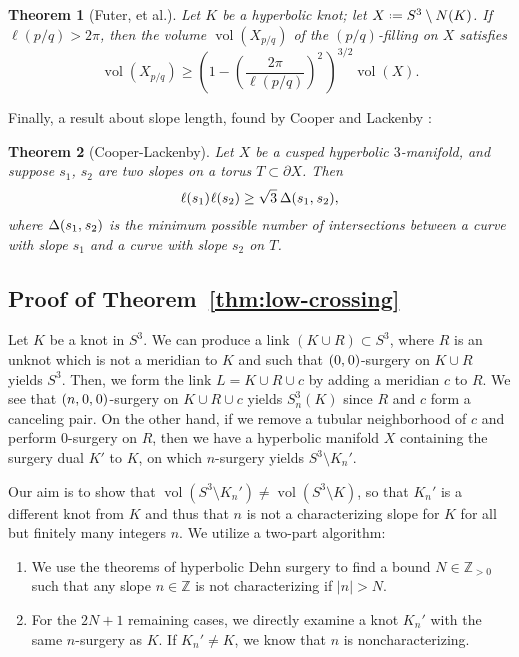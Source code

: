 \documentclass[11pt,usenames,dvipsnames,reqno]{amsart}
\newcommand{\zz}{\mathbb{Z}}
\newcommand{\vol}{\operatorname{vol}}
\newcommand{\defeq}{\mathrel{\vcenter{\baselineskip0.5ex\lineskiplimit0pt\hbox{\scriptsize.}\hbox{\scriptsize.}}}=}
\newcommand{\hs}{\hspace{0.05em}} %
\newtheorem{theorem}{Theorem}
\numberwithin{theorem}{section}
\theoremstyle{ex}
\theoremstyle{rem}
\begin{document}
\begin{theorem}[Futer, et al.]\label{Futer}
Let $K$ be a hyperbolic knot; let $X\defeq S^3\setminus N(K)$. If $\ell(p/q)>2\pi$, then the volume $\vol(X_{p/q})$ of the $(p/q)$-filling on $X$ satisfies
\[\vol(X_{p/q})\ge\left(1-\left(\frac{2\pi}{\ell(p/q)}\right)^2\,\right)^{3/2}\vol(X).\]
\end{theorem}

Finally, a result about slope length, found by Cooper and Lackenby \cite{cooper-lackenby}:

\begin{theorem}[Cooper-Lackenby]\label{CooperLack}
Let $X$ be a cusped hyperbolic $3$-manifold, and suppose $s_1$, $s_2$ are two slopes on a torus $T\subset \partial X$. Then
\[\ell(s_1)\hs\ell(s_2)\ge\sqrt{3}\hspace{0.2em}\Delta(s_1,\hs s_2),\]
where $\Delta(s_1,\hs s_2)$ is the minimum possible number of intersections between a curve with slope $s_1$ and a curve with slope $s_2$ on $T$.
\end{theorem}

\subsection{Proof of Theorem~\ref{thm:low-crossing}}

Let $K$ be a knot in $S^3$. We can produce a link $(K\cup R)\subset S^3$, where $R$ is an unknot which is not a meridian to $K$ and such that $(0,\hs0)$-surgery on $K\cup R$ yields $S^3$. Then, we form the link $L = K \cup R \cup c$ by adding a meridian $c$ to $R$. We see that $(n,\hs0,\hs0)$-surgery on $K \cup R \cup c$ yields $S^3_n(K)$ since $R$ and $c$ form a canceling pair. On the other hand, if we remove a tubular neighborhood of $c$ and perform $0$-surgery on $R$, then we have a hyperbolic manifold $X$ containing the surgery dual $K'$ to $K$, on which $n$-surgery yields $S^3\setminus K_n'$.

Our aim is to show that $\vol(S^3\setminus K_n')\ne\vol(S^3\setminus K)$, so that $K_n'$ is a different knot from $K$ and thus that $n$ is not a characterizing slope for $K$ for all but finitely many integers $n$. We utilize a two-part algorithm:

\begin{enumerate}
	\item We use the theorems of hyperbolic Dehn surgery to find a bound $N \in \zz_{>0}$ such that any slope $n \in \zz$ is not characterizing if $|n|>N$.
	\item For the $2 N + 1$ remaining cases, we directly examine a knot $K_{n}'$ with the same $n$-surgery as $K$. If $K_{n}' \neq K$, we know that $n$ is noncharacterizing.
\end{enumerate}
\end{document}
